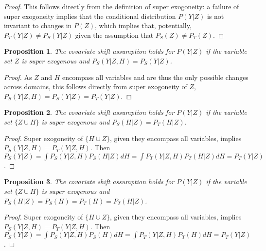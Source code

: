 \documentclass[a4paper,12pt]{article}
\newtheorem{prop}{Proposition}
\begin{document}
\begin{proof}
  This follows directly from the definition of super exogoneity: a failure of super exogoneity implies that the conditional distribution $P(Y|Z)$ is not invariant to changes in $P(Z)$, which implies that, potentially, $P_T(Y|Z) \neq P_S(Y|Z)$ given the assumption that $P_S(Z) \neq P_T(Z)$.
\end{proof}

\begin{prop}
  The covariate shift assumption holds for $P(Y|Z)$ if the variable set $Z$ is super exogenous and $P_S(Y|Z, H) = P_S(Y | Z)$.
\end{prop}

\begin{proof}
As $Z$ and $H$ encompass all variables and are thus the only possible changes across domains, this follows directly from super exogoneity of $Z$, $P_S(Y|Z, H) = P_S(Y | Z) = P_T(Y | Z)$.
\end{proof}

\begin{prop}
  The covariate shift assumption holds for $P(Y|Z)$ if the variable set $\{ Z \cup H \}$ is super exogenous and $P_S(H|Z) = P_T(H|Z)$.
\end{prop}

\begin{proof}
  Super exogoneity of $\{H \cup Z \}$, given they encompass all variables, implies $P_S(Y|Z,H) = P_T(Y|Z,H)$. Then $P_S(Y|Z) = \int P_S(Y|Z,H)P_S(H|Z) dH = \int P_T(Y|Z,H)P_T(H|Z) dH = P_T(Y|Z)$.
\end{proof}

\begin{prop}
  The covariate shift assumption holds for $P(Y|Z)$ if the variable set $\{ Z \cup H \}$ is super exogenous and $P_S(H|Z) = P_S(H) = P_T(H) = P_T(H|Z)$.
\end{prop}

\begin{proof}
  Super exogoneity of $\{H \cup Z \}$, given they encompass all variables, implies $P_S(Y|Z,H) = P_T(Y|Z,H)$. Then $P_S(Y|Z) = \int P_S(Y|Z,H)P_S(H) dH = \int P_T(Y|Z,H)P_T(H) dH = P_T(Y|Z)$.
\end{proof}


\end{document}
